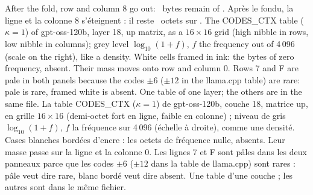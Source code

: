   {After the fold, row and column 8 go out: \CodonNOctetsSymbolesB\ bytes remain of \CodonNOctetsSymbolesA.}
  {Après le fondu, la ligne et la colonne 8 s'éteignent : il reste \CodonNOctetsSymbolesB\ octets sur \CodonNOctetsSymbolesA.}
  {The CODES\_CTX table ($\kappa=1$) of gpt-oss-120b, layer 18, up matrix, as a $16\times16$ grid (high nibble in
   rows, low nibble in columns); grey level $\log_{10}(1+f)$, $f$ the frequency out of 4\,096 (scale on the right),
   like a density. White cells framed in ink: the bytes of zero frequency, absent. Their mass moves onto row and
   column 0. Rows 7 and F are pale in both panels because the codes $\pm6$ ($\pm12$ in the llama.cpp table) are
   rare: pale is rare, framed white is absent. One table of one layer; the others are in the same file.}
  {La table CODES\_CTX ($\kappa=1$) de gpt-oss-120b, couche 18, matrice up, en grille $16\times16$ (demi-octet fort
   en ligne, faible en colonne) ; niveau de gris $\log_{10}(1+f)$, $f$ la fréquence sur 4\,096 (échelle à droite),
   comme une densité. Cases blanches bordées d'encre : les octets de fréquence nulle, absents. Leur masse passe sur
   la ligne et la colonne 0. Les lignes 7 et F sont pâles dans les deux panneaux parce que les codes $\pm6$ ($\pm12$
   dans la table de llama.cpp) sont rares : pâle veut dire rare, blanc bordé veut dire absent. Une table d'une
   couche ; les autres sont dans le même fichier.}

